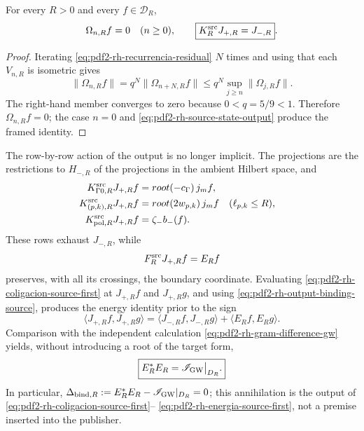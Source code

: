 \begin{proposition}
\label{prop:pdf2-rh-omega-cero}
For every \(R>0\) and every \(f\in\mathcal D_R\),
\begin{equation}\label{eq:pdf2-rh-output-binding-source}
 \Omega_{n,R}f=0\quad(n\geq0),
 \qquad
 \boxed{\mathcal K_R^{\rm src}J_{+,R}=J_{-,R}}.
\end{equation}
\end{proposition}

\begin{proof}
Iterating \eqref{eq:pdf2-rh-recurrencia-residual} \(N\) times and using that each
\(V_{n,R}\) is isometric gives
\[
 \|\Omega_{n,R}f\|
 =q^N\|\Omega_{n+N,R}f\|
 \leq q^N\sup_{j\geq n}\|\Omega_{j,R}f\|.
\]
The right-hand member converges to zero because \(0<q=5/9<1\). Therefore
\(\Omega_{n,R}f=0\); the case \(n=0\) and
\eqref{eq:pdf2-rh-source-state-output} produce the framed identity.
\end{proof}

The row-by-row action of the output is no longer implicit. The projections are
the restrictions to \(H_{-,R}\) of the projections in the ambient Hilbert space, and
\begin{equation}\label{eq:pdf2-rh-salidas-generador-a-generador}
\begin{aligned}
 \mathcal K_{\Gamma0,R}^{\rm src}J_{+,R}f
  &=\sqrt{-c_\Gamma}\,j_mf,\\
 \mathcal K_{(p,k),R}^{\rm src}J_{+,R}f
  &=\sqrt{2w_{p,k}}\,j_mf
  &&(\ell_{p,k}\leq R),\\
 \mathcal K_{{\rm pol},R}^{\rm src}J_{+,R}f
  &=\zeta_-b_-(f).
\end{aligned}
\end{equation}
These rows exhaust \(J_{-,R}\), while
\begin{equation}\label{eq:pdf2-rh-frontera-generador-a-generador}
 \mathcal F_R^{\rm src}J_{+,R}f=E_Rf
\end{equation}
preserves, with all its crossings, the boundary coordinate.
Evaluating \eqref{eq:pdf2-rh-coligacion-source-first} at \(J_{+,R}f\) and
\(J_{+,R}g\), and using \eqref{eq:pdf2-rh-output-binding-source}, produces the
energy identity prior to the sign
\begin{equation}\label{eq:pdf2-rh-energia-source-first}
 \boxed{
 \langle J_{+,R}f,J_{+,R}g\rangle
 =\langle J_{-,R}f,J_{-,R}g\rangle
  +\langle E_Rf,E_Rg\rangle.}
\end{equation}
Comparison with the independent calculation
\eqref{eq:pdf2-rh-gram-difference-gw} yields, without introducing a root of
the target form,
\begin{equation}\label{eq:pdf2-rh-binding-source-first}
 \boxed{E_R^*E_R=\mathscr I_{\rm GW}\big|_{\mathcal D_R}.}
\end{equation}
In particular,
\(\Delta_{{\rm bind},R}
:=E_R^*E_R-\mathscr I_{\rm GW}|_{\mathcal D_R}=0\); this annihilation is the
output of \eqref{eq:pdf2-rh-coligacion-source-first}--
\eqref{eq:pdf2-rh-energia-source-first}, not a premise inserted into the
publisher.


